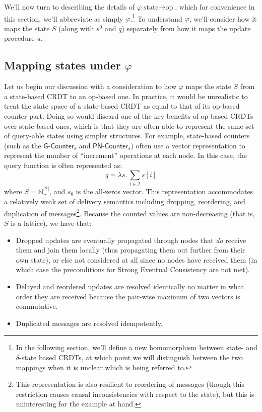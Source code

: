 We'll now turn to describing the details of $\varphi{\text{state} \to \text{op}}$,
which for convenience in this section, we'll abbreviate as simply
$\varphi$.\footnote{In the following section, we'll define a new homomorphism
between state- and $\delta$-state based CRDTs, at which point we will
distinguish between the two mappings when it is unclear which is being referred
to.} To understand $\varphi$, we'll consider how it maps the state $S$ (along with
$s^0$ and $q$) separately from how it maps the update procedure $u$.

\subsection{Mapping states under $\varphi$}
Let us begin our discussion with a consideration to how $\varphi$ maps the state
$S$ from a state-based CRDT to an op-based one. In practice, it would be
unrealistic to treat the state space of a state-based CRDT as equal to that of
its op-based counter-part. Doing so would discard one of the key benefits of
op-based CRDTs over state-based ones, which is that they are often able to
represent the same set of query-able states using simpler structures. For
example, state-based counters (such as the $\textsf{G-Counter}_s$ and
$\textsf{PN-Counter}_s$) often use a vector representation to represent the
number of ``increment'' operations at each node. In this case, the query
function is often represented as:
\[
  q = \lambda s.\, \sum_{i \in \mathcal{I}} s[i]
\]
where $S = \mathbb{N}^{|\mathcal{I}|}_+$, and $s_0$ is the all-zeros vector.
This representation accommodates a relatively weak set of delivery semantics
including dropping, reordering, and duplication of messages\footnote{This
representation is also resilient to reordering of messages (though this
restriction causes causal inconsistencies with respect to the state), but this
is uninteresting for the example at hand.}. Because the counted values are
non-decreasing (that is, $S$ is a lattice), we have that:
\begin{itemize}
  \item Dropped updates are eventually propagated through nodes that \emph{do}
    receive them and join them locally (thus propagating them out further from
    their own state), or else not considered at all since no nodes have received
    them (in which case the preconditions for Strong Eventual Consistency are
    not met).
  \item Delayed and reordered updates are resolved identically no matter in what
    order they are received because the pair-wise maximum of two vectors is
    commutative.
  \item Duplicated messages are resolved idempotently.
\end{itemize}
